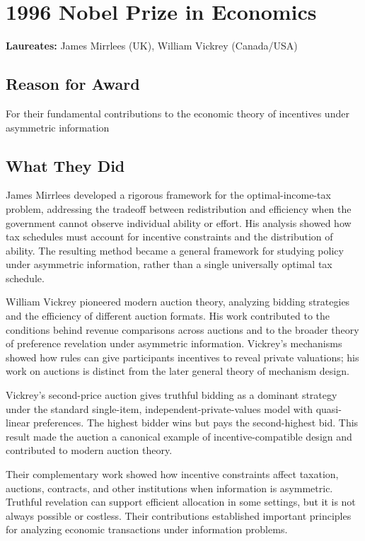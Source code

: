 \chapter{1996 Nobel Prize in Economics}
\textbf{Laureates: }James Mirrlees (UK), William Vickrey (Canada/USA)

\section*{Reason for Award}
For their fundamental contributions to the economic theory of incentives under
asymmetric information

\section{What They Did}
James Mirrlees developed a rigorous framework for the optimal-income-tax
problem, addressing the tradeoff between redistribution and efficiency when the
government cannot observe individual ability or effort. His analysis showed how
tax schedules must account for incentive constraints and the distribution of
ability. The resulting method became a general framework for studying policy
under asymmetric information, rather than a single universally optimal tax
schedule.

William Vickrey pioneered modern auction theory, analyzing bidding strategies
and the efficiency of different auction formats. His work contributed to the
conditions behind revenue comparisons across auctions and to the broader theory
of preference revelation under asymmetric information. Vickrey's mechanisms
showed how rules can give participants incentives to reveal private valuations;
his work on auctions is distinct from the later general theory of mechanism
design.

Vickrey's second-price auction gives truthful bidding as a dominant strategy
under the standard single-item, independent-private-values model with
quasi-linear preferences. The highest bidder wins but pays the second-highest
bid. This result made the auction a canonical example of incentive-compatible
design and contributed to modern auction theory.

Their complementary work showed how incentive constraints affect taxation,
auctions, contracts, and other institutions when information is asymmetric.
Truthful revelation can support efficient allocation in some settings, but it
is not always possible or costless. Their contributions established important
principles for analyzing economic transactions under information problems.

